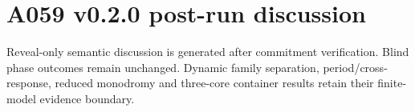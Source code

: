\section*{A059 v0.2.0 post-run discussion}
Reveal-only semantic discussion is generated after commitment verification. Blind phase outcomes remain unchanged. Dynamic family separation, period/cross-response, reduced monodromy and three-core container results retain their finite-model evidence boundary.
